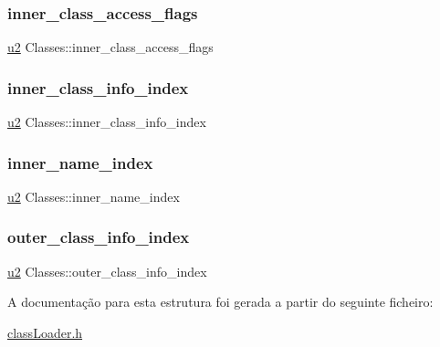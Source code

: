 \subsubsection{\texorpdfstring{inner\+\_\+class\+\_\+access\+\_\+flags}{inner\_class\_access\_flags}}
{\footnotesize\ttfamily \hyperlink{util_8h_a55ef8d87fd202b8417704c089899c5b9}{u2} Classes\+::inner\+\_\+class\+\_\+access\+\_\+flags}

\mbox{\label{struct_classes_a81deba58ea3d27176396999857216eba}} 
\subsubsection{\texorpdfstring{inner\+\_\+class\+\_\+info\+\_\+index}{inner\_class\_info\_index}}
{\footnotesize\ttfamily \hyperlink{util_8h_a55ef8d87fd202b8417704c089899c5b9}{u2} Classes\+::inner\+\_\+class\+\_\+info\+\_\+index}

\mbox{\label{struct_classes_ae675c3ce50aa5f7714c632aef5b004b9}} 
\subsubsection{\texorpdfstring{inner\+\_\+name\+\_\+index}{inner\_name\_index}}
{\footnotesize\ttfamily \hyperlink{util_8h_a55ef8d87fd202b8417704c089899c5b9}{u2} Classes\+::inner\+\_\+name\+\_\+index}

\mbox{\label{struct_classes_a7437bc55eb998ea0d4eec7b8ebda32c5}} 
\subsubsection{\texorpdfstring{outer\+\_\+class\+\_\+info\+\_\+index}{outer\_class\_info\_index}}
{\footnotesize\ttfamily \hyperlink{util_8h_a55ef8d87fd202b8417704c089899c5b9}{u2} Classes\+::outer\+\_\+class\+\_\+info\+\_\+index}



A documentação para esta estrutura foi gerada a partir do seguinte ficheiro\+:\begin{DoxyCompactItemize}
\item 
\hyperlink{class_loader_8h}{class\+Loader.\+h}\end{DoxyCompactItemize}
